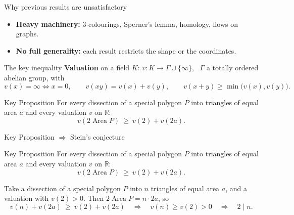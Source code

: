 \documentclass[aspectratio=169,11pt]{beamer}
\newcommand{\R}{\mathbb{R}}
\newcommand{\Area}{\operatorname{Area}}
\begin{document}
\begin{frame}{Why previous results are unsatisfactory}
\vfill
\begin{itemize}
\item \textbf{Heavy machinery:} 3-colourings, Sperner's lemma, homology, flows on graphs.
\bigskip
\item \textbf{No full generality:} each result restricts the shape or the coordinates.
\end{itemize}
\vfill
\end{frame}



\begin{frame}{The key inequality}
\textbf{Valuation} on a field $K$: \; $v\colon K\to\Gamma\cup\{\infty\}$, \, $\Gamma$ a totally ordered abelian group, with
\[
v(x)=\infty\iff x=0,\qquad v(xy)=v(x)+v(y),\qquad v(x+y)\ge\min\bigl(v(x),v(y)\bigr).
\]

\vfill
\begin{block}{Key Proposition}
For every dissection of a special polygon $P$ into triangles of equal area $a$ and every valuation $v$ on $\R$:
\[
v(2\Area P)\ \ge\ v(2)+v(2a).
\]
\end{block}
\vfill
\end{frame}

\begin{frame}{Key Proposition $\Rightarrow$ Stein's conjecture}
\vfill
\begin{block}{Key Proposition}
For every dissection of a special polygon $P$ into triangles of equal area $a$ and every valuation $v$ on $\R$:
\[
v(2\Area P)\ \ge\ v(2)+v(2a).
\]
\end{block}
\vfill
Take a dissection of a special polygon $P$ into $n$ triangles of equal area $a$, and a valuation with $v(2)>0$. Then $2\Area P=n\cdot 2a$, so
\[
v(n)+v(2a)\ \ge\ v(2)+v(2a)\quad\Longrightarrow\quad v(n)\ge v(2)>0\quad\Longrightarrow\quad 2\mid n .
\]
\vfill
\end{frame}
\end{document}
